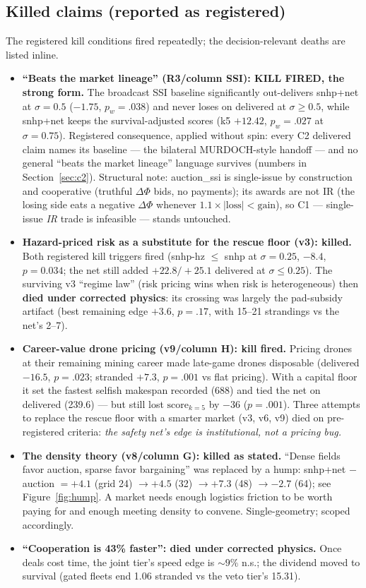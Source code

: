 \documentclass[sigconf,nonacm]{acmart}
\begin{document}
\subsection{Killed claims (reported as registered)}\label{sec:kills}

The registered kill conditions fired repeatedly; the decision-relevant
deaths are listed inline.

\begin{itemize}
\item \textbf{``Beats the market lineage'' (R3/column SSI): KILL FIRED, the
strong form.} The broadcast SSI baseline significantly out-delivers
snhp+net at $\sigma{=}0.5$ ($-1.75$, $p_w{=}.038$) and never loses on
delivered at $\sigma{\geq}0.5$, while snhp+net keeps the survival-adjusted
scores (k5 $+12.42$, $p_w{=}.027$ at $\sigma{=}0.75$). Registered
consequence, applied without spin: every C2 delivered claim names its
baseline --- the bilateral MURDOCH-style handoff --- and no general ``beats
the market lineage'' language survives (numbers in
Section~\ref{sec:c2}). Structural note: auction\_ssi is single-issue by
construction and cooperative (truthful $\Delta\Phi$ bids, no payments); its
awards are not IR (the losing side eats a negative $\Delta\Phi$ whenever
$1.1\times|\mathrm{loss}| < \mathrm{gain}$), so C1 --- single-issue
\emph{IR} trade is infeasible --- stands untouched.
\item \textbf{Hazard-priced risk as a substitute for the rescue floor (v3):
killed.} Both registered kill triggers fired (snhp-hz $\leq$ snhp at
$\sigma{=}0.25$, $-8.4$, $p{=}0.034$; the net still added $+22.8/+25.1$
delivered at $\sigma{\leq}0.25$). The surviving v3 ``regime law'' (risk
pricing wins when risk is heterogeneous) then \textbf{died under corrected
physics}: its crossing was largely the pad-subsidy artifact (best remaining
edge $+3.6$, $p{=}.17$, with 15--21 strandings vs the net's 2--7).
\item \textbf{Career-value drone pricing (v9/column H): kill fired.}
Pricing drones at their remaining mining career made late-game drones
disposable (delivered $-16.5$, $p{=}.023$; stranded $+7.3$, $p{=}.001$ vs
flat pricing). With a capital floor it set the fastest selfish makespan
recorded (688) and tied the net on delivered (239.6) --- but still lost
$\mathrm{score}_{k=5}$ by $-36$ ($p{=}.001$). Three attempts to replace the
rescue floor with a smarter market (v3, v6, v9) died on pre-registered
criteria: \emph{the safety net's edge is institutional, not a pricing
bug.}
\item \textbf{The density theory (v8/column G): killed as stated.} ``Dense
fields favor auction, sparse favor bargaining'' was replaced by a hump:
snhp+net $-$ auction $= +4.1$ (grid 24) $\to +4.5$ (32) $\to +7.3$ (48)
$\to -2.7$ (64); see Figure~\ref{fig:hump}. A market needs enough logistics
friction to be worth paying for and enough meeting density to convene.
Single-geometry; scoped accordingly.
\item \textbf{``Cooperation is 43\% faster'': died under corrected
physics.} Once deals cost time, the joint tier's speed edge is ${\sim}9\%$
n.s.; the dividend moved to survival (gated fleets end 1.06 stranded vs the
veto tier's 15.31).
\end{itemize}
\end{document}

